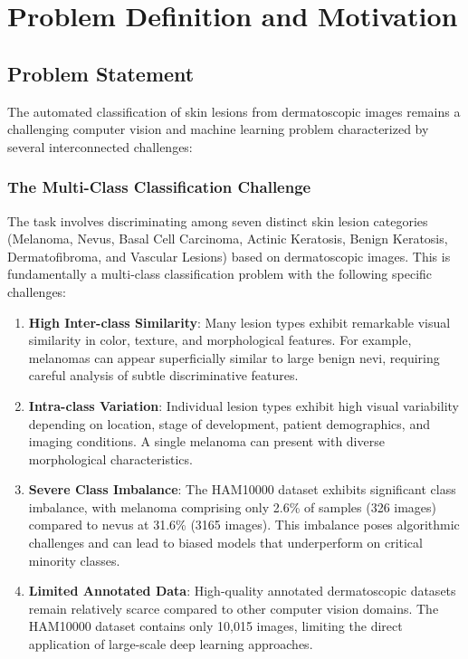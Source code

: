 \chapter{Problem Definition and Motivation}
\label{ch:problem_statement}

\section{Problem Statement}

The automated classification of skin lesions from dermatoscopic images remains a challenging computer vision and machine learning problem characterized by several interconnected challenges:

\subsection{The Multi-Class Classification Challenge}

The task involves discriminating among seven distinct skin lesion categories (Melanoma, Nevus, Basal Cell Carcinoma, Actinic Keratosis, Benign Keratosis, Dermatofibroma, and Vascular Lesions) based on dermatoscopic images. This is fundamentally a multi-class classification problem with the following specific challenges:

\begin{enumerate}
    \item \textbf{High Inter-class Similarity}: Many lesion types exhibit remarkable visual similarity in color, texture, and morphological features. For example, melanomas can appear superficially similar to large benign nevi, requiring careful analysis of subtle discriminative features.
    
    \item \textbf{Intra-class Variation}: Individual lesion types exhibit high visual variability depending on location, stage of development, patient demographics, and imaging conditions. A single melanoma can present with diverse morphological characteristics.
    
    \item \textbf{Severe Class Imbalance}: The HAM10000 dataset exhibits significant class imbalance, with melanoma comprising only 2.6\% of samples (326 images) compared to nevus at 31.6\% (3165 images). This imbalance poses algorithmic challenges and can lead to biased models that underperform on critical minority classes.
    
    \item \textbf{Limited Annotated Data}: High-quality annotated dermatoscopic datasets remain relatively scarce compared to other computer vision domains. The HAM10000 dataset contains only 10,015 images, limiting the direct application of large-scale deep learning approaches.
\end{enumerate}

